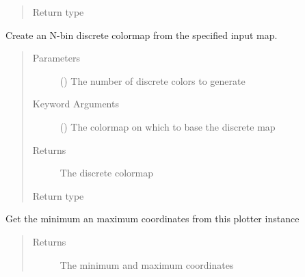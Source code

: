\documentclass[letterpaper,10pt,english]{sphinxmanual}
\begin{document}
\begin{fulllineitems}
\begin{fulllineitems}
\begin{quote}
\begin{description}
\item[{Return type}] \leavevmode
{}

\end{description}\end{quote}

\end{fulllineitems}


\begin{fulllineitems}
\label{\detokenize{documentation:faerun.Faerun.discrete_cmap}}
Create an N-bin discrete colormap from the specified input map.
\begin{quote}\begin{description}
\item[{Parameters}] \leavevmode
{} () \textendash{} The number of discrete colors to generate

\item[{Keyword Arguments}] \leavevmode
{} () \textendash{} The colormap on which to base the discrete map

\item[{Returns}] \leavevmode
The discrete colormap

\item[{Return type}] \leavevmode
{}

\end{description}\end{quote}

\end{fulllineitems}


\begin{fulllineitems}
\label{\detokenize{documentation:faerun.Faerun.get_min_max}}
Get the minimum an maximum coordinates from this plotter instance
\begin{quote}\begin{description}
\item[{Returns}] \leavevmode
The minimum and maximum coordinates


\end{description}
\end{quote}
\end{fulllineitems}
\end{fulllineitems}
\end{document}

